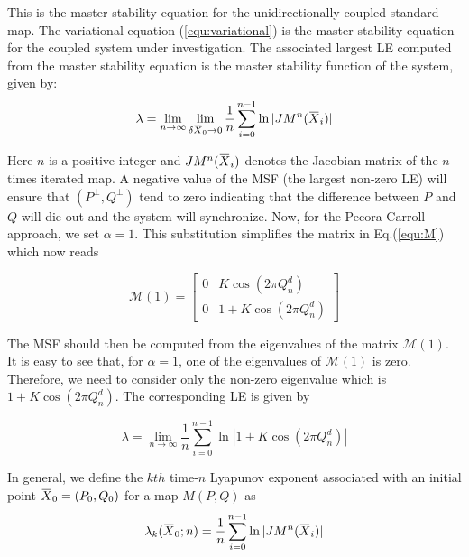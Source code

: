 \documentclass[reprint,superscriptaddress,amsmath,amssymb,aps,pre]{revtex4-1}
\newcommand{\overbar}[1]{\mkern 1.5mu\overline{\mkern-1.5mu#1\mkern-1.5mu}\mkern 1.5mu}
\begin{document}
This is the master stability equation for the unidirectionally coupled standard map. The variational equation (\ref{equ:variational}) is the master stability equation for the coupled system under investigation. The associated largest LE computed from the master stability equation is the master stability function of the system, given by:
\begin{equation}
\label{equ:msf}
\lambda  = \lim_{n \rightarrow \infty} \lim_{\delta\overbar{X}_0\rightarrow 0}\frac{1}{n}\sum^{n-1}_{i=0}\ln|JM^n(\overbar{X}_i)|
\end{equation}

Here $n$ is a positive integer and $JM^n(\overbar{X}_i)$ denotes the Jacobian matrix of the $n$-times iterated map.  A negative value of the MSF (the largest non-zero LE) will ensure that $(P^\perp,Q^\perp) $ tend to zero indicating that the difference between $P$ and $Q$ will die out and the system will synchronize. 
Now, for the Pecora-Carroll approach, we set $\alpha = 1$. This substitution simplifies the matrix in Eq.(\ref{equ:M}) which now reads

\begin{equation} 
\mathcal{M}(1)= \begin{bmatrix} 0 & K\cos(2\pi Q^d_n) \\ 0 & 1 + K\cos(2\pi Q^d_n) \end{bmatrix} 
\end{equation}

The MSF should then be computed from the eigenvalues of the matrix $\mathcal{M}(1)$. It is easy to see that, for $\alpha =1$, one of the eigenvalues of   $\mathcal{M}(1)$ is zero. Therefore, we need to consider only the non-zero eigenvalue which is $1+K\cos(2\pi Q^d_n)$. The corresponding LE is given by

\begin{equation}
\label{equ:LE}
\lambda   = \lim_{n \rightarrow \infty} \frac{1}{n}\sum^{n-1}_{i=0}\ln|1+K\cos(2\pi Q^d_n)|
\end{equation}

In general, we define the $kth$ time-$n$ Lyapunov exponent associated with an initial point $\overbar{X}_0 = (P_0,Q_0)$ for a map $M(P,Q)$ as
\begin{equation}
\label{equ:FLEf}
\lambda _k(\overbar{X}_0;n)  = \frac{1}{n}\sum^{n-1}_{i=0}\ln|JM^n(\overbar{X}_i)|
\end{equation}
\end{document}
